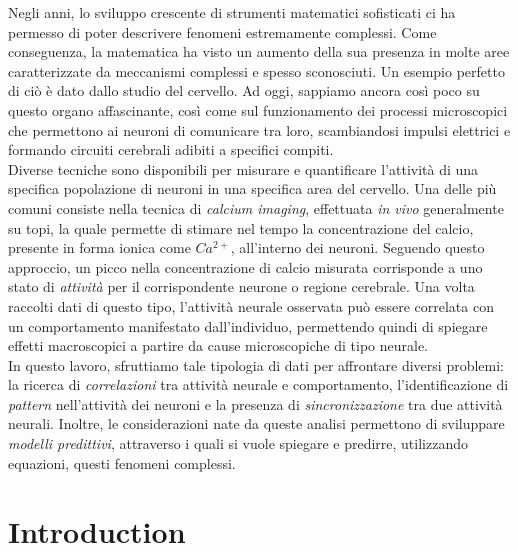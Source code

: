 \documentclass[12pt, a4paper]{report}
\begin{document}
Negli anni, lo sviluppo crescente di strumenti matematici sofisticati ci ha permesso di poter descrivere fenomeni estremamente complessi. Come conseguenza, la matematica ha visto un aumento della sua presenza in molte aree caratterizzate da meccanismi complessi e spesso sconosciuti. Un esempio perfetto di ciò è dato dallo studio del cervello. Ad oggi, sappiamo ancora così poco su questo organo affascinante, così come sul funzionamento dei processi microscopici che permettono ai neuroni di comunicare tra loro, scambiandosi impulsi elettrici e formando circuiti cerebrali adibiti a specifici compiti.\\
Diverse tecniche sono disponibili per misurare e quantificare l'attività di una specifica popolazione di neuroni in una specifica area del cervello. Una delle più comuni consiste nella tecnica di \textit{calcium imaging}, effettuata \textit{in vivo} generalmente su topi, la quale permette di stimare nel tempo la concentrazione del calcio, presente in forma ionica come  $Ca^{2+}$, all'interno dei neuroni. Seguendo questo approccio, un picco nella concentrazione di calcio misurata corrisponde a uno stato di \textit{attività} per il corrispondente neurone o regione cerebrale. Una volta raccolti dati di questo tipo, l'attività neurale osservata può essere correlata con un comportamento manifestato dall'individuo, permettendo quindi di spiegare effetti macroscopici a partire da cause microscopiche di tipo neurale.\\
In questo lavoro, sfruttiamo tale tipologia di dati per affrontare diversi problemi: la ricerca di \textit{correlazioni} tra attività neurale e comportamento, l'identificazione di \textit{pattern} nell'attività dei neuroni e la presenza di \textit{sincronizzazione} tra due attività neurali. Inoltre, le considerazioni nate da queste analisi permettono di sviluppare \textit{modelli predittivi}, attraverso i quali si vuole spiegare e predirre, utilizzando equazioni, questi fenomeni complessi.	
		
	\chapter*{Introduction}
\end{document}
